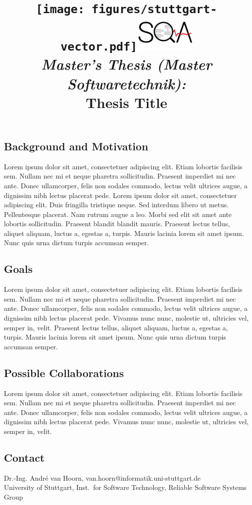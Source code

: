\documentclass[a4paper,12pt]{article}
\date{}
\title{
\texttt{[image: figures/stuttgart-vector.pdf]}\hfill{\includegraphics[width=3cm]{figures/sqa_logo.png}}
\quad \\ [0.5cm]
{\large \textit{Master's Thesis (Master Softwaretechnik):}} \\ [1mm]
{\Large Thesis Title}
}
\begin{document}
	

\maketitle

\thispagestyle{empty}

\vspace{-2.5cm}


\subsection*{Background and Motivation}
Lorem ipsum dolor sit amet, consectetuer adipiscing elit. Etiam lobortis facilisis sem. Nullam nec
mi et neque pharetra sollicitudin. Praesent imperdiet mi nec ante. Donec ullamcorper, felis non
sodales commodo, lectus velit ultrices augue, a dignissim nibh lectus placerat pede. \cite{newman2015building} 
Lorem ipsum dolor sit amet, consectetuer adipiscing elit. Duis fringilla tristique neque. Sed interdum libero ut metus.
Pellentesque placerat. Nam rutrum augue a leo. Morbi sed elit sit amet ante lobortis sollicitudin.
Praesent blandit blandit mauris. Praesent lectus tellus, aliquet aliquam, luctus a, egestas a, turpis.
Mauris lacinia lorem sit amet ipsum. Nunc quis urna dictum turpis accumsan semper.


\subsection*{Goals}
Lorem ipsum dolor sit amet, consectetuer adipiscing elit. Etiam lobortis facilisis sem. Nullam nec
mi et neque pharetra sollicitudin. Praesent imperdiet mi nec ante. Donec ullamcorper, felis non
sodales commodo, lectus velit ultrices augue, a dignissim nibh lectus placerat pede. Vivamus nunc
nunc, molestie ut, ultricies vel, semper in, velit. \cite{bass2015devops} 
Praesent lectus tellus, aliquet aliquam, luctus a, egestas a, turpis.
Mauris lacinia lorem sit amet ipsum. Nunc quis urna dictum turpis accumsan semper.


\subsection*{Possible Collaborations}
Lorem ipsum dolor sit amet, consectetuer adipiscing elit. Etiam lobortis facilisis sem. Nullam nec
mi et neque pharetra sollicitudin. Praesent imperdiet mi nec ante. Donec ullamcorper, felis non
sodales commodo, lectus velit ultrices augue, a dignissim nibh lectus placerat pede. Vivamus nunc
nunc, molestie ut, ultricies vel, semper in, velit. \cite{pitakrat2016archaware}

\begin{scriptsize}


\end{scriptsize}

\subsection*{Contact}
Dr.-Ing. André van Hoorn, van.hoorn@informatik.uni-stuttgart.de \\
University of Stuttgart, Inst.\ for Software Technology, Reliable Software Systems Group \\
\end{document}
